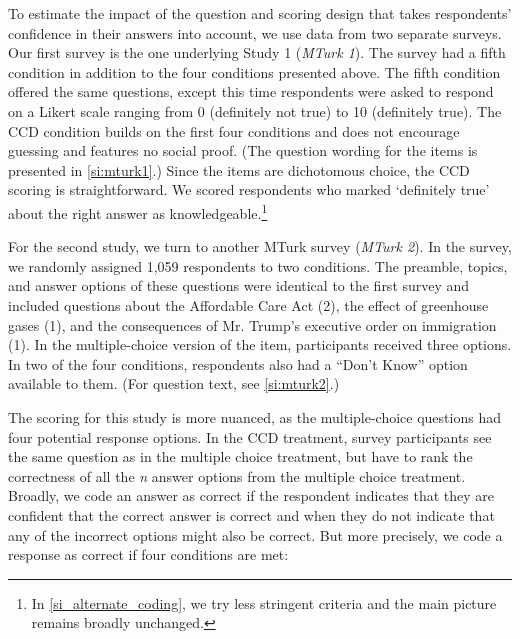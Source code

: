\documentclass[12pt, letterpaper]{article}
\begin{document}
To estimate the impact of the question and scoring design that takes respondents' confidence in their answers into account, we use data from two separate surveys. Our first survey is the one underlying Study 1 (\emph{MTurk 1}). The survey had a fifth condition in addition to the four conditions presented above. The fifth condition offered the same questions, except this time respondents were asked to respond on a Likert scale ranging from 0 (definitely not true) to 10 (definitely true). The CCD condition builds on the first four conditions and does not encourage guessing and features no social proof. (The question wording for the items is presented in \cref{si:mturk1}.) Since the items are dichotomous choice, the CCD scoring is straightforward. We scored respondents who marked `definitely true' about the right answer as knowledgeable.\footnote{In \cref{si_alternate_coding}, we try less stringent criteria and the main picture remains broadly unchanged.}

For the second study, we turn to another MTurk survey (\emph{MTurk 2}). In the survey, we randomly assigned 1,059 respondents to two conditions. The preamble, topics, and answer options of these questions were identical to the first survey and included questions about the Affordable Care Act (2), the effect of greenhouse gases (1), and the consequences of Mr. Trump's executive order on immigration (1). In the multiple-choice version of the item, participants received three options. In two of the four conditions, respondents also had a ``Don't Know'' option available to them. (For question text, see \cref{si:mturk2}.)

The scoring for this study is more nuanced, as the multiple-choice questions had four potential response options. In the CCD treatment, survey participants see the same question as in the multiple choice treatment, but have to rank the correctness of all the \emph{n} answer options from the multiple choice treatment. Broadly, we code an answer as correct if the respondent indicates that they are confident that the correct answer is correct and when they do not indicate that any of the incorrect options might also be correct. But more precisely, we code a response as correct if four conditions are met:
\end{document}
